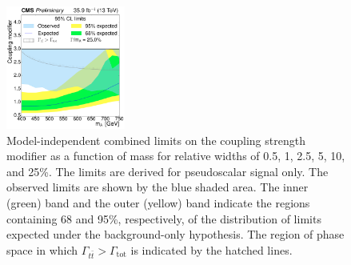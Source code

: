 \begin{figure}[!Hhtb]
\includegraphics[width=0.35\textwidth,keepaspectratio=true]{fig/chapt8/limits/limit_A_25.pdf}
\caption{Model-independent combined limits on the coupling strength modifier as a function of mass for relative widths of 0.5, 1, 2.5, 5, 10, and 25\%. The limits are derived for pseudoscalar signal only. The observed limits are shown by the blue shaded area. The inner (green) band and the outer (yellow) band indicate the regions containing 68 and 95\%, respectively, of the distribution of limits expected under the background-only hypothesis. The region of phase space in which $\Gamma_{t\bar t}>\Gamma_\mathrm{tot}$ is indicated by the hatched lines.}
\label{fig:limits_a_widths}
\end{figure}

